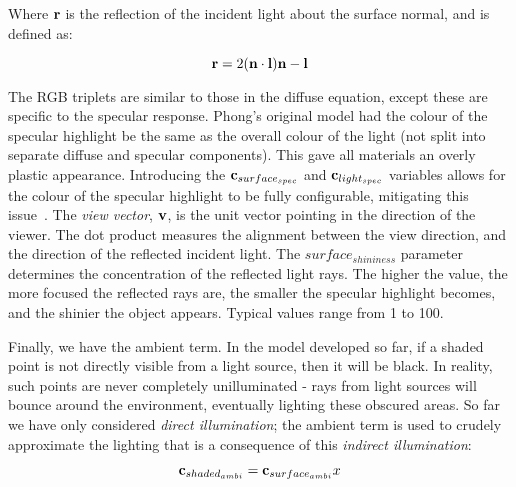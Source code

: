 Where \begin{math}\mathbf{r}\end{math} is the reflection of the incident light about the surface normal, and is defined as:

\begin{equation}
	\mathbf{r} = 2(\mathbf{n}\cdot\mathbf{l})\mathbf{n} - \mathbf{l}
\end{equation}

The RGB triplets are similar to those in the diffuse equation, except these are specific to the specular response. Phong's original model had the colour of the specular highlight be the same as the overall colour of the light (not split into separate diffuse and specular components). This gave all materials an overly plastic appearance. Introducing the \begin{math}\mathbf{c}_{surface_{spec}}\end{math} and \begin{math}\mathbf{c}_{light_{spec}}\end{math} variables allows for the colour of the specular highlight to be fully configurable, mitigating this issue~\cite{LightingModelForComputerAnimators}. The \textit{view vector}, \begin{math}\mathbf{v}\end{math}, is the unit vector pointing in the direction of the viewer. The dot product measures the alignment between the view direction, and the direction of the reflected incident light. The \begin{math}surface_{shininess}\end{math} parameter determines the concentration of the reflected light rays. The higher the value, the more focused the reflected rays are, the smaller the specular highlight becomes, and the shinier the object appears. Typical values range from 1 to 100.

Finally, we have the ambient term. In the model developed so far, if a shaded point is not directly visible from a light source, then it will be black. In reality, such points are never completely unilluminated - rays from light sources will bounce around the environment, eventually lighting these obscured areas. So far we have only considered \textit{direct illumination}; the ambient term is used to crudely approximate the lighting that is a consequence of this \textit{indirect illumination}:

\begin{equation} \label{eq:BlinnPhongAmbient}
	\mathbf{c}_{shaded_{ambi}} = \mathbf{c}_{surface_{ambi}}x
\end{equation}

